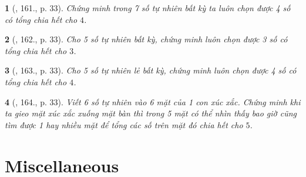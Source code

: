 \documentclass{article}
\newtheorem{baitoan}{}
\begin{document}
\begin{baitoan}[\cite{Tuyen_Toan_6}, 161., p. 33]
	Chứng minh trong 7 số tự nhiên bất kỳ ta luôn chọn được 4 số có tổng chia hết cho $4$.
\end{baitoan}

\begin{baitoan}[\cite{Tuyen_Toan_6}, 162., p. 33]
	Cho 5 số tự nhiên bất kỳ, chứng minh luôn chọn được 3 số có tổng chia hết cho $3$.
\end{baitoan}

\begin{baitoan}[\cite{Tuyen_Toan_6}, 163., p. 33]
	Cho 5 số tự nhiên lẻ bất kỳ, chứng minh luôn chọn được 4 số có tổng chia hết cho $4$.
\end{baitoan}

\begin{baitoan}[\cite{Tuyen_Toan_6}, 164., p. 33]
	Viết 6 số tự nhiên vào 6 mặt của 1 con xúc xắc. Chứng minh khi ta gieo mặt xúc xắc xuống mặt bàn thì trong 5 mặt có thể nhìn thấy bao giờ cũng tìm được 1 hay nhiều mặt để tổng các số trên mặt đó chia hết cho $5$.
\end{baitoan}


\section{Miscellaneous}


\printbibliography[heading=bibintoc]
\end{document}
